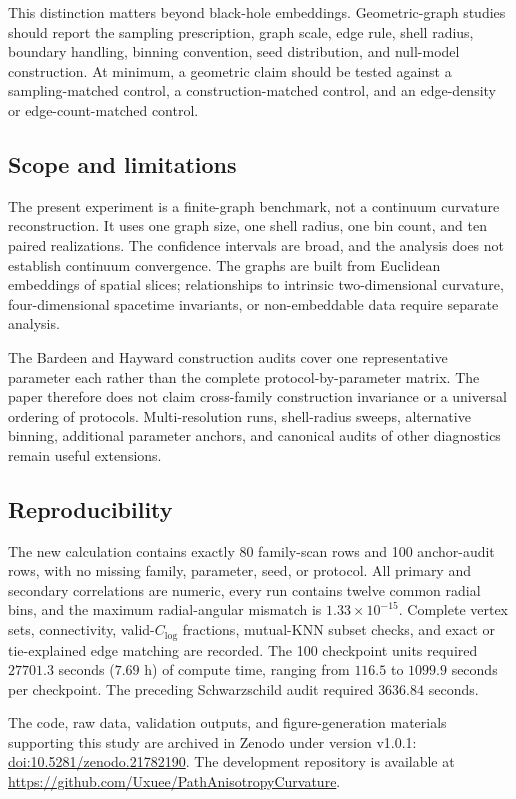 \documentclass[11pt]{article}
\newcommand{\clog}{C_{\log}}
\begin{document}
This distinction matters beyond black-hole embeddings. Geometric-graph studies
should report the sampling prescription, graph scale, edge rule, shell radius,
boundary handling, binning convention, seed distribution, and null-model
construction. At minimum, a geometric claim should be tested against a
sampling-matched control, a construction-matched control, and an edge-density
or edge-count-matched control.

\subsection{Scope and limitations}

The present experiment is a finite-graph benchmark, not a continuum curvature
reconstruction. It uses one graph size, one shell radius, one bin count, and ten
paired realizations. The confidence intervals are broad, and the analysis does
not establish continuum convergence. The graphs are built from Euclidean
embeddings of spatial slices; relationships to intrinsic two-dimensional
curvature, four-dimensional spacetime invariants, or non-embeddable data require
separate analysis.

The Bardeen and Hayward construction audits cover one representative parameter
each rather than the complete protocol-by-parameter matrix. The paper therefore
does not claim cross-family construction invariance or a universal ordering of
protocols. Multi-resolution runs, shell-radius sweeps, alternative binning,
additional parameter anchors, and canonical audits of other diagnostics remain
useful extensions.

\subsection{Reproducibility}

The new calculation contains exactly 80 family-scan rows and 100 anchor-audit
rows, with no missing family, parameter, seed, or protocol. All primary and
secondary correlations are numeric, every run contains twelve common radial
bins, and the maximum radial-angular mismatch is $1.33\times10^{-15}$. Complete
vertex sets, connectivity, valid-$\clog$ fractions, mutual-KNN subset checks,
and exact or tie-explained edge matching are recorded. The 100 checkpoint units
required $27701.3$ seconds ($7.69$ h) of compute time, ranging from $116.5$ to
$1099.9$ seconds per checkpoint. The preceding Schwarzschild audit required
$3636.84$ seconds.

The code, raw data, validation outputs, and figure-generation materials
supporting this study are archived in Zenodo under version v1.0.1:
\href{https://doi.org/10.5281/zenodo.21782190}{doi:10.5281/zenodo.21782190}.
The development repository is available at
\url{https://github.com/Uxuee/PathAnisotropyCurvature}.
\end{document}
